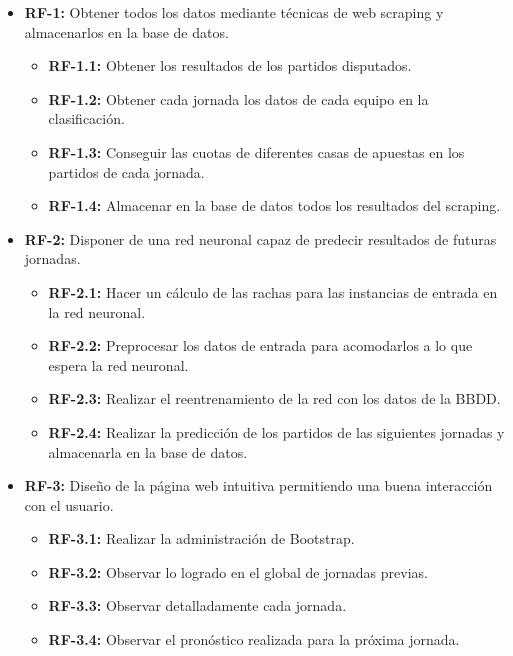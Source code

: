 \begin{itemize}
\item \textbf{RF-1: }Obtener todos los datos mediante técnicas de web scraping y almacenarlos en la base de datos.
\begin{itemize}
\item \textbf{RF-1.1: }Obtener los resultados de los partidos disputados.

\item \textbf{RF-1.2: }Obtener cada jornada los datos de cada equipo en la clasificación.

\item \textbf{RF-1.3: }Conseguir las cuotas de diferentes casas de apuestas en los partidos de cada jornada.

\item \textbf{RF-1.4: }Almacenar en la base de datos todos los resultados del scraping.

\end{itemize}

\item \textbf{RF-2: }Disponer de una red neuronal capaz de predecir resultados de futuras jornadas.
\begin{itemize}

\item \textbf{RF-2.1: }Hacer un cálculo de las rachas para las instancias de entrada en la red neuronal.

\item \textbf{RF-2.2: }Preprocesar los datos de entrada para acomodarlos a lo que espera la red neuronal.

\item \textbf{RF-2.3: }Realizar el reentrenamiento de la red con los datos de la BBDD.

\item \textbf{RF-2.4: }Realizar la predicción de los partidos de las siguientes jornadas y almacenarla en la base de datos.

\end{itemize}

\item \textbf{RF-3: }Diseño de la página web intuitiva permitiendo una buena interacción con el usuario.

\begin{itemize}
\item \textbf{RF-3.1: }Realizar la administración de Bootstrap.

\item \textbf{RF-3.2: }Observar lo logrado en el global de jornadas previas.

\item \textbf{RF-3.3: }Observar detalladamente cada jornada.

\item \textbf{RF-3.4: }Observar el pronóstico realizada para la próxima jornada.
\end{itemize}

\end{itemize}

